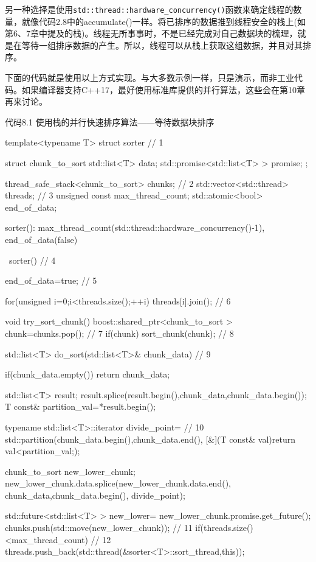 另一种选择是使用\texttt{std::thread::hardware\_concurrency()}函数来确定线程的数量，就像代码2.8中的accumulate()一样。将已排序的数据推到线程安全的栈上(如第6、7章中提及的栈)。线程无所事事时，不是已经完成对自己数据块的梳理，就是在等待一组排序数据的产生。所以，线程可以从栈上获取这组数据，并且对其排序。

下面的代码就是使用以上方式实现。与大多数示例一样，只是演示，而非工业代码。如果编译器支持C++17，最好使用标准库提供的并行算法，这些会在第10章再来讨论。

代码8.1 使用栈的并行快速排序算法——等待数据块排序

\begin{cpp}
template<typename T>
struct sorter  // 1
{
  struct chunk_to_sort
  {
    std::list<T> data;
    std::promise<std::list<T> > promise;
  };

  thread_safe_stack<chunk_to_sort> chunks;  // 2
  std::vector<std::thread> threads;  // 3
  unsigned const max_thread_count;
  std::atomic<bool> end_of_data;

  sorter():
    max_thread_count(std::thread::hardware_concurrency()-1),
    end_of_data(false)
  {}

  ~sorter()  // 4
  {
    end_of_data=true;  // 5

    for(unsigned i=0;i<threads.size();++i)
    {
      threads[i].join();  // 6
    }
  }

  void try_sort_chunk()
  {
    boost::shared_ptr<chunk_to_sort > chunk=chunks.pop();  // 7
    if(chunk)
    {
      sort_chunk(chunk);  // 8
    }
  }

  std::list<T> do_sort(std::list<T>& chunk_data)  // 9
  {
    if(chunk_data.empty())
    {
      return chunk_data;
    }

    std::list<T> result;
    result.splice(result.begin(),chunk_data,chunk_data.begin());
    T const& partition_val=*result.begin();

    typename std::list<T>::iterator divide_point=  // 10
       std::partition(chunk_data.begin(),chunk_data.end(),
        [&](T const& val){return val<partition_val;});

    chunk_to_sort new_lower_chunk;
    new_lower_chunk.data.splice(new_lower_chunk.data.end(),
       chunk_data,chunk_data.begin(),
       divide_point);

    std::future<std::list<T> > new_lower=
      new_lower_chunk.promise.get_future();
    chunks.push(std::move(new_lower_chunk));  // 11
    if(threads.size()<max_thread_count)  // 12
    {
      threads.push_back(std::thread(&sorter<T>::sort_thread,this));
    }

}}
\end{cpp}
